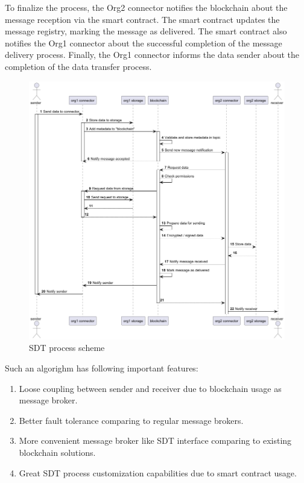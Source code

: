 \documentclass[10pt]{llncs}
\begin{document}
To finalize the process, the Org2 connector notifies the blockchain about the message reception via the smart contract. 
The smart contract updates the message registry, marking the message as delivered. 
The smart contract also notifies the Org1 connector about the successful completion of the message delivery process. 
Finally, the Org1 connector informs the data sender about the completion of the data transfer process.

\begin{figure}
    \includegraphics[width=\textwidth]{sending_process.png}
    \caption{SDT process scheme} \label{sending_process}
\end{figure}

Such an algorighm has following important features:

\begin{enumerate}
    \item Loose coupling between sender and receiver due to blockchain usage as message broker.
    \item Better fault tolerance comparing to regular message brokers.
    \item More convenient message broker like SDT interface comparing to existing blockchain solutions.
    \item Great SDT process customization capabilities due to smart contract usage.
\end{enumerate}
\end{document}
